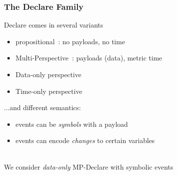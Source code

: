 \documentclass{beamer}
\begin{document}
\begin{frame}
\frametitle{The Declare Family}

Declare comes in several variants

\begin{itemize}
	\item propositional~\cite{}: no payloads, no time
	\item Multi-Perspective~\cite{}: payloads (data), metric time
	\item Data-only perspective
	\item Time-only perspective
\end{itemize}

...and different semantics:
\begin{itemize}
	\item events can be \emph{symbols} with a payload
	\item events can encode \emph{changes} to certain variables
\end{itemize}

~\\

We consider \emph{data-only} MP-Declare with symbolic events

\end{frame}

\end{document}
